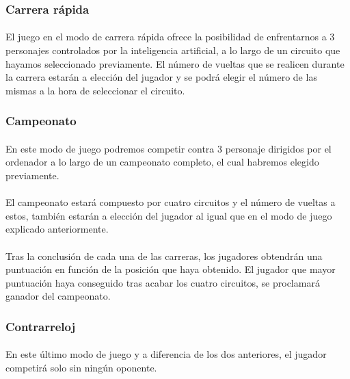 \subsubsection{Carrera rápida} 

\paragraph{}
El juego en el modo de carrera rápida ofrece la posibilidad de enfrentarnos a 3 personajes 
controlados por la inteligencia artificial, a lo largo de un circuito que
hayamos seleccionado previamente. El número de vueltas
que se realicen durante la carrera estarán a elección del jugador y se podrá elegir el número de las mismas a la hora de seleccionar
el circuito.

\subsubsection{Campeonato} 

\paragraph{}
En este modo de juego podremos competir contra 3 personaje dirigidos por el ordenador
a lo largo de un campeonato completo, el cual habremos elegido previamente. 

\paragraph{}
El campeonato estará compuesto por cuatro circuitos y el número de vueltas a estos, también estarán a elección del jugador 
al igual que en el modo de juego explicado anteriormente.

\paragraph{}
Tras la conclusión de cada una de las carreras, los jugadores obtendrán una puntuación en función de la posición que haya 
obtenido. El jugador que mayor puntuación haya conseguido tras acabar los cuatro circuitos, se proclamará ganador del 
campeonato.

\subsubsection{Contrarreloj} 

\paragraph{}
En este último modo de juego y a diferencia de los dos anteriores, el jugador competirá solo sin ningún oponente.

